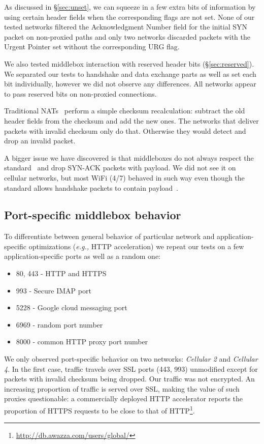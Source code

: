 \documentclass{sig-alternate-10pt}
\providecommand{\eg}{\emph{e.g.,} }
\begin{document}
As discussed in \S\ref{sec:unset}, we can squeeze in a few extra bits of information by using certain header fields when the corresponding flags are not set. None of our tested networks filtered the Acknowledgment Number field for the initial SYN packet on non-proxied paths and only two networks discarded packets with the Urgent Pointer set without the corresponding URG flag.

We also tested middlebox interaction with reserved header bits (\S\ref{sec:reserved}). We separated our tests to handshake and data exchange parts as well as set each bit individually, however we did not observe any differences. All networks appear to pass reserved bits on non-proxied connections.

Traditional NATs~\cite{Egevang:tu} perform a simple checksum recalculation: subtract the old header fields from the checksum and add the new ones. The networks that deliver packets with invalid checksum only do that. Otherwise they would detect and drop an invalid packet.

A bigger issue we have discovered is that middleboxes do not always respect the standard~\cite{Postel:3EDyoxP_} and drop SYN-ACK packets with payload. We did not see it on cellular networks, but most WiFi (4/7) behaved in such way even though the standard allows handshake packets to contain payload~\cite{Postel:3EDyoxP_,Chu:2011tn}.

\subsection{Port-specific middlebox behavior}
\label{sec:portspec}

To differentiate between general behavior of particular network and application-specific optimizations (\eg HTTP acceleration) we repeat our tests on a few application-specific ports as well as a random one:
\begin{itemize}
    \item 80, 443 - HTTP and HTTPS
    \item 993 - Secure IMAP port
    \item 5228 - Google cloud messaging port
    \item 6969 - random port number
    \item 8000 - common HTTP proxy port number
\end{itemize}

We only observed port-specific behavior on two networks: \emph{Cellular 2} and \emph{Cellular 4}. In the first case, traffic travels over SSL ports (443, 993) unmodified except for packets with invalid checksum being dropped. Our traffic was not encrypted. An increasing proportion of traffic is served over SSL, making the value of such proxies questionable: a commercially deployed HTTP accelerator reports the proportion of HTTPS requests to be close to that of HTTP\footnote{\url{http://db.awazza.com/users/global/}}.
\end{document}
